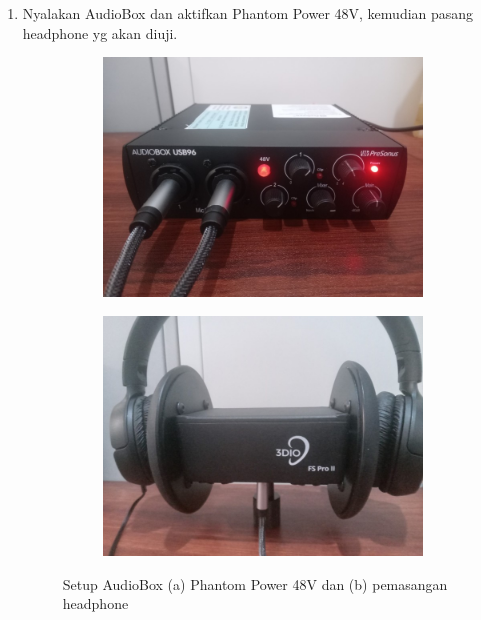 \documentclass{article}
\begin{document}
\begin{enumerate}
		\newpage
		\item Nyalakan AudioBox dan aktifkan Phantom Power 48V, kemudian pasang headphone yg akan diuji.

		\begin{figure}[H]
			\centering
			\begin{subfigure}[]{.45\textwidth}
				\includegraphics[width=\textwidth]{images/fspro/setup4}
				\caption{}
			\end{subfigure}
			\begin{subfigure}[]{.45\textwidth}
				\includegraphics[width=\textwidth]{images/fspro/setup5}
				\caption{}
			\end{subfigure}
			\caption{Setup AudioBox (a) Phantom Power 48V dan (b) pemasangan headphone}
			\label{fig:Setup FS2Pro Selesai}
		\end{figure}

	\end{enumerate}
	
\end{document}
